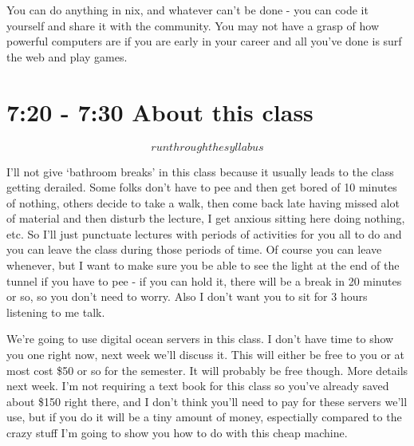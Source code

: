 \documentclass[10pt]{article}
\begin{document}
You can do anything in \*nix, and whatever can't be done - you can code it yourself and share it with the community. You may not have a grasp of how powerful computers are if you are early in your career and all you've done is surf the web and play games.


\section{7:20 - 7:30 About this class}
\[ run through the syllabus \]

I'll not give `bathroom breaks' in this class because it usually leads to the
class getting derailed. Some folks don't have to pee and then get bored of 10
minutes of nothing, others decide to take a walk, then come back late having
missed alot of material and then disturb the lecture, I get anxious sitting here
doing nothing, etc. So I'll just punctuate lectures with periods of activities
for you all to do and you can leave the class during those periods of time. Of
course you can leave whenever, but I want to make sure you be able to see the
light at the end of the tunnel if you have to pee - if you can hold it, there
will be a break in 20 minutes or so, so you don't need to worry. Also I don't
want you to sit for 3 hours listening to me talk.

We're going to use digital ocean servers in this class. I don't have time to
show you one right now, next week we'll discuss it. This will either be free to
you or at most cost \$50 or so for the semester. It will probably be free though.
More details next week. I'm not requiring a text book for this class so you've
already saved about \$150 right there, and I don't think you'll need to pay for
these servers we'll use, but if you do it will be a tiny amount of money,
espectially compared to the crazy stuff I'm going to show you how to do with
this cheap machine.
\end{document}
